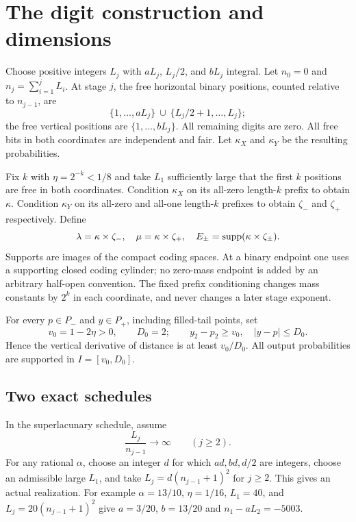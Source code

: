 \section{The digit construction and dimensions}\label{sec:construction}
Choose positive integers $L_j$ with $aL_j$, $L_j/2$, and $bL_j$ integral.
Let $n_0=0$ and $n_j=\sum_{i=1}^j L_i$. At stage $j$, the free horizontal
binary positions, counted relative to $n_{j-1}$, are
\begin{equation}\label{eq:free-positions}
 \{1,\ldots,aL_j\}\ \cup\ \{L_j/2+1,\ldots,L_j\};
\end{equation}
the free vertical positions are $\{1,\ldots,bL_j\}$. All remaining
digits are zero. All free bits in both coordinates are independent and fair.
Let $\kappa_X$ and $\kappa_Y$ be the resulting probabilities.

Fix $k$ with $\eta=2^{-k}<1/8$ and take $L_1$ sufficiently large that
the first $k$ positions are free in both coordinates. Condition $\kappa_X$
on its all-zero length-$k$ prefix to obtain $\kappa$. Condition $\kappa_Y$
on its all-zero and all-one length-$k$ prefixes to obtain $\zeta_-$ and
$\zeta_+$ respectively. Define
\begin{equation}\label{eq:measures}
 \lambda=\kappa\times\zeta_-,\quad
 \mu=\kappa\times\zeta_+,\quad E_\pm=\operatorname{supp}(\kappa\times\zeta_\pm).
\end{equation}
Supports are images of the compact coding spaces. At a binary endpoint one
uses a supporting closed coding cylinder; no zero-mass endpoint is added
by an arbitrary half-open convention. The fixed prefix conditioning changes
mass constants by $2^k$ in each coordinate, and never changes a later
stage exponent.

For every $p\in P_-$ and $y\in P_+$, including filled-tail points, set
\begin{equation}\label{eq:separation}
 v_0=1-2\eta>0,\qquad D_0=2;
 \qquad y_2-p_2\geq v_0,\quad |y-p|\leq D_0.
\end{equation}
Hence the vertical derivative of distance is at least $v_0/D_0$.
All output probabilities are supported in $I=[v_0,D_0]$.

\subsection{Two exact schedules}
In the superlacunary schedule, assume
\begin{equation}\label{eq:superlacunary}
 \frac{L_j}{n_{j-1}}\longrightarrow\infty\qquad(j\geq2).
\end{equation}
For any rational $\alpha$, choose an integer $d$ for which $ad,bd,d/2$
are integers, choose an admissible large $L_1$, and take
$L_j=d(n_{j-1}+1)^2$ for $j\geq2$. This gives an actual realization.
For example $\alpha=13/10$, $\eta=1/16$, $L_1=40$, and
$L_j=20(n_{j-1}+1)^2$ give $a=3/20$, $b=13/20$ and
$n_1-aL_2=-5003$.

